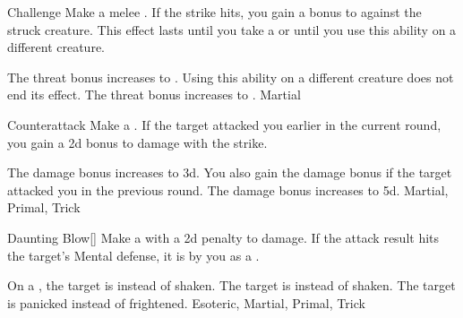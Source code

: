 \lowercase{\hypertarget{maneuver:Challenge}{}}\label{maneuver:Challenge}
\hypertarget{maneuver:Challenge}{}
\begin{freeability}{Challenge}
Make a melee .
If the strike hits, you gain a  bonus to  against the struck creature.
This effect lasts until you take a  or until you use this ability on a different creature.

\rankline
{} The threat bonus increases to .
 Using this ability on a different creature does not end its effect.
 The threat bonus increases to .
 Martial
\end{freeability}
\vspace{0.25em}



\lowercase{\hypertarget{maneuver:Counterattack}{}}\label{maneuver:Counterattack}
\hypertarget{maneuver:Counterattack}{}
\begin{freeability}{Counterattack}
Make a .
If the target attacked you earlier in the current round, you gain a \plus2d bonus to damage with the strike.

\rankline
{} The damage bonus increases to \plus3d.
 You also gain the damage bonus if the target attacked you in the previous round.
 The damage bonus increases to \plus5d.
 Martial, Primal, Trick
\end{freeability}
\vspace{0.25em}



\lowercase{\hypertarget{maneuver:Daunting Blow}{}}\label{maneuver:Daunting Blow}
\hypertarget{maneuver:Daunting Blow}{}
\begin{freeability}{Daunting Blow}[]
Make a  with a \minus2d penalty to damage.
If the attack result hits the target's Mental defense,
it is  by you as a .

\rankline
{} On a , the target is  instead of shaken.
 The target is  instead of shaken.
 The target is panicked instead of frightened.
 Esoteric, Martial, Primal, Trick
\end{freeability}
\vspace{0.25em}



